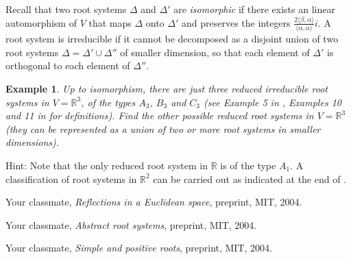 \documentclass[11pt]{amsart}
\newcommand{\R}{\mathbb R}
\newcommand{\la}{\langle}
\newcommand{\ra}{\rangle}
\newtheorem{example}[theorem]{Example}
\begin{document}
Recall that two root systems $\Delta$ and $\Delta'$ are \emph{isomorphic} 
if there exists an linear automorphism of $V$ that maps 
$\Delta$ onto $\Delta'$ and preserves the integers
$\frac{2\la \beta, \alpha\ra}{\la \alpha, \alpha\ra}i$. 
A root system is irreducible if it 
cannot be decomposed as a disjoint union of two root systems 
$\Delta = \Delta' \cup \Delta''$ of smaller dimension, so that each 
element of $\Delta'$ is orthogonal to each element of $\Delta''$. 

\begin{example} Up to isomorphism, there are just three reduced irreducible 
root systems in $V=\R^3$, of the types $A_3$, $B_3$ and $C_3$ 
(see Example 5 in \cite{2}, Examples 10 and 11 in \cite{3} for 
definitions). Find the other possible reduced root systems in $V= \R^3$ (they 
can be represented as a union of two or more root systems in 
smaller dimensions). 
\end{example}
Hint: Note that the only reduced root system in $\R$ 
is of the type $A_1$. A classification of root systems in $\R^2$
can be carried out as indicated at the end of \cite{2}.


\begin{thebibliography}{2}

 Your classmate, {\it Reflections in a Euclidean space}, 
preprint, MIT, 2004.

 Your classmate, {\it Abstract root systems}, 
preprint, MIT, 2004. 

 Your classmate, {\it Simple and positive roots},
preprint, MIT, 2004.

\end{thebibliography}
\end{document}
